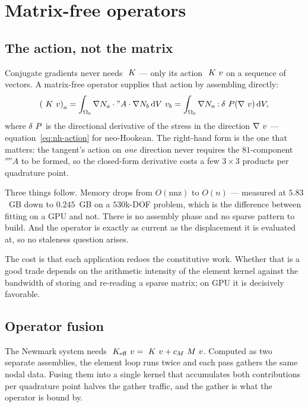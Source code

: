 \chapter{Matrix-free operators}
\label{ch:matrixfree}

\section{The action, not the matrix}

Conjugate gradients never needs $~K$ --- only its action $~K~v$ on
a sequence of vectors.  A matrix-free operator supplies that action by
assembling directly:
\begin{equation}
  \left(~K~v\right)_a
  = \int_{\Omega_0} \nabla N_a \cdot "A \cdot \nabla N_b \, \mathrm{d}V \ v_b
  = \int_{\Omega_0} \nabla N_a \mathbin{:} \delta~P(\nabla ~v) \, \mathrm{d}V,
  \label{eq:action}
\end{equation}
where $\delta~P$ is the directional derivative of the stress in the
direction $\nabla~v$ --- equation~\eqref{eq:nh-action} for neo-Hookean.
The right-hand form is the one that matters: the tangent's action on
\emph{one} direction never requires the $81$-component $\fourth{A}$ to be
formed, so the closed-form derivative costs a few $3\times3$ products per
quadrature point.

Three things follow.  Memory drops from $O(\text{nnz})$ to $O(n)$ --- measured
at $5.83$~GB down to $0.245$~GB on a $530$k-DOF problem, which is the
difference between fitting on a GPU and not.  There is no assembly phase and no
sparse pattern to build.  And the operator is exactly as current as the
displacement it is evaluated at, so no staleness question arises.

The cost is that each application redoes the constitutive work.  Whether that
is a good trade depends on the arithmetic intensity of the element kernel
against the bandwidth of storing and re-reading a sparse matrix; on GPU it is
decisively favorable.

\section{Operator fusion}

The Newmark system needs $~K_{\mathrm{eff}}~v = ~K~v + c_M~M~v$.
Computed as two separate assemblies, the element loop runs twice and each pass
gathers the same nodal data.  Fusing them into a single kernel that accumulates
both contributions per quadrature point halves the gather traffic, and the
gather is what the operator is bound by.

